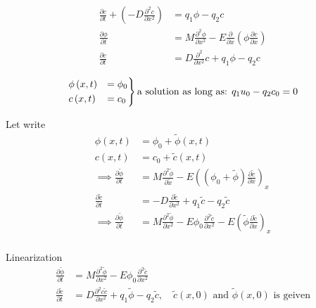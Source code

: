 \documentclass{article}
\theoremstyle{remark}
\begin{document}
 \[
   \begin{split}
 \frac{\partial c}{\partial t}  + \left( -D \frac{\partial ^2 c}{\partial x ^2}  \right) &=  q_{1} \phi - q_{2} c \\
 \frac{\partial \phi }{\partial t}  &=  M \frac{\partial ^2 \phi }{\partial x ^2}  - E \frac{\partial }{\partial x} \left( \phi \frac{\partial c}{\partial x}  \right) \\
 \frac{\partial c}{\partial t} &=  D \frac{\partial ^2}{\partial x ^2} c + q_{1} \phi - q_{2} c \\
   \end{split} 
 \] 
 \[
 \begin{rcases}
   \phi \left( x,t \right)  & = \phi _{0} \\
   c\left( x,t \right) &= c_{0} \\
 \end{rcases}
 \text{a solution as long as: } q_{1} u_{0} - q_{2} c_{0} = 0
 \] 

 Let write \[
   \begin{split}
 \phi \left( x,t \right) &=  \phi _{0} +  \widetilde{\phi }\left( x,t \right) \\
 c\left( x,t \right) &=  c_{0} + \widetilde{c}\left( x,t \right) \\
 \implies  \frac{\partial \widetilde{\phi }}{\partial t}  &=  M \frac{\partial ^2 \widetilde{\phi }}{\partial  \widetilde{x}}   - E \left( \left( \phi _{0} + \widetilde{\phi } \right) \frac{\partial \widetilde{c}}{\partial x}   \right)_{x}  \\
 \frac{\partial \widetilde{c}}{\partial t}  &=  -D \frac{\partial \widetilde{c}}{\partial x ^2} + q_{1} \widetilde{c} - q_{2} \widetilde{c}  \\
 \implies  \frac{\partial \widetilde{\phi }}{\partial t}  &=  M \frac{\partial ^2 \widetilde{\phi }}{\partial  x ^2}   - E \phi _{0}  \frac{\partial ^2 \widetilde{c}}{\partial x ^2 } - E \left( \widetilde{\phi } \frac{\partial \widetilde{c}}{\partial x }  \right)_{x}  \\
   \end{split} 
 \] 

 Linearization \[
   \begin{split}
 \frac{\partial \widetilde{\phi }}{\partial t}  &=  M \frac{\partial ^2 \widetilde{ \phi }}{\partial x ^2 } - E \phi _{0} \frac{\partial ^2 \widetilde{c}}{\partial  x ^2}   \\
 \frac{\partial \widetilde{c}  }{\partial t}  &=  D \frac{\partial ^2 c \widetilde{c}}{\partial x ^2 } + q_{1} \widetilde{\phi } - q_{2} \widetilde{c}, \quad \widetilde{c} \left( x,0 \right) \text{ and } \widetilde{\phi } \left( x,0 \right) \text{ is geiven}\\
   \end{split} 
 \] 
\end{document}
